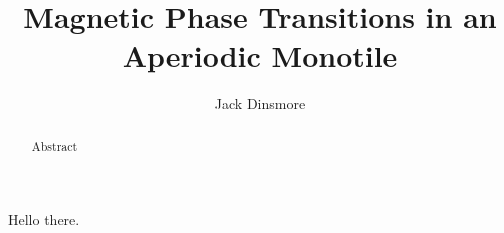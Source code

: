 \documentclass[11pt]{revtex4}
\begin{document}
\title{Magnetic Phase Transitions in an Aperiodic Monotile}
\author{Jack Dinsmore}

\begin{abstract}
  Abstract
\end{abstract}

\maketitle

Hello there.
\end{document}
